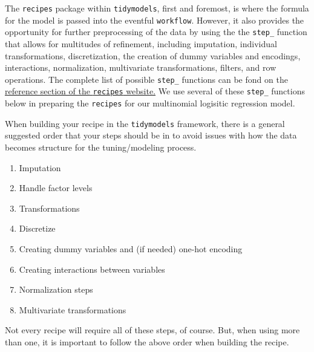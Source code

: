 \documentclass[
  letterpaper,
]{krantz}
\providecommand{\tightlist}{%
  \setlength{\itemsep}{0pt}\setlength{\parskip}{0pt}}\usepackage{longtable,booktabs,array}
\begin{document}
The \texttt{recipes} package within \texttt{tidymodels}, first and
foremost, is where the formula for the model is passed into the eventful
\texttt{workflow}. However, it also provides the opportunity for further
preprocessing of the data by using the the \texttt{step\_} function that
allows for multitudes of refinement, including imputation, individual
transformations, discretization, the creation of dummy variables and
encodings, interactions, normalization, multivariate transformations,
filters, and row operations. The complete list of possible
\texttt{step\_} functions can be fond on the
\href{https://recipes.tidymodels.org/reference/index.html}{reference
section of the \texttt{recipes} website.} We use several of these
\texttt{step\_} functions below in preparing the \texttt{recipes} for
our multinomial logisitic regression model.

\begin{tcolorbox}[enhanced jigsaw, colback=white, leftrule=.75mm, breakable, colframe=quarto-callout-tip-color-frame, bottomtitle=1mm, rightrule=.15mm, left=2mm, opacityback=0, bottomrule=.15mm, arc=.35mm, coltitle=black, colbacktitle=quarto-callout-tip-color!10!white, toptitle=1mm, titlerule=0mm, title=\textcolor{quarto-callout-tip-color}{\faLightbulb}\hspace{0.5em}{Tip}, toprule=.15mm, opacitybacktitle=0.6]

When building your recipe in the \texttt{tidymodels} framework, there is
a general suggested order that your steps should be in to avoid issues
with how the data becomes structure for the tuning/modeling process.

\begin{enumerate}
\def\labelenumi{\arabic{enumi}.}
\tightlist
\item
  Imputation
\item
  Handle factor levels
\item
  Transformations
\item
  Discretize
\item
  Creating dummy variables and (if needed) one-hot encoding
\item
  Creating interactions between variables
\item
  Normalization steps
\item
  Multivariate transformations
\end{enumerate}

Not every recipe will require all of these steps, of course. But, when
using more than one, it is important to follow the above order when
building the recipe.

\end{tcolorbox}
\end{document}
